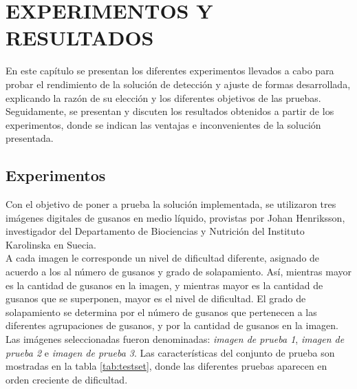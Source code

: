 \thispagestyle{empty}
\cleardoublepage
\chapter{EXPERIMENTOS Y RESULTADOS}
\label{chap:experiments}


En este cap\'itulo se presentan los diferentes experimentos llevados a cabo
para probar el rendimiento de la soluci\'on de detecci\'on y ajuste de formas
desarrollada, explicando la raz\'on de su elecci\'on y los diferentes objetivos
de las pruebas. Seguidamente, se presentan y discuten los resultados obtenidos a
partir de los experimentos, donde se indican las ventajas e inconvenientes 
de la soluci\'on presentada.

\section{Experimentos}
\label{sec:experiments}

Con el objetivo de poner a prueba la soluci\'on implementada, se utilizaron tres im\'agenes
digitales de gusanos en medio l\'iquido, provistas por Johan Henriksson, investigador del
Departamento de Biociencias y Nutrici\'on del Instituto Karolinska en Suecia.\\

A cada imagen le corresponde un nivel de dificultad diferente, asignado de acuerdo a los
al n\'umero de gusanos y grado de solapamiento. As\'i, mientras mayor es la cantidad
de gusanos en la imagen, y mientras mayor es la cantidad de gusanos que se superponen, 
mayor es el nivel de dificultad. El grado de solapamiento se determina por el n\'umero
de gusanos que pertenecen a las diferentes agrupaciones de gusanos, y por la cantidad
de gusanos en la imagen.\\

Las im\'agenes seleccionadas fueron denominadas: \emph{imagen de prueba 1}, \emph{imagen de prueba 2} e
\emph{imagen de prueba 3}. Las caracter\'isticas del conjunto de prueba son mostradas en la tabla \ref{tab:testset}, donde
las diferentes pruebas aparecen en orden creciente de dificultad.


